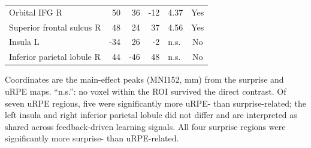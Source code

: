 \begin{table}[htbp]
\begin{threeparttable}
\begin{tabularx}{\textwidth}{l *{3}{R} l c}
        Orbital IFG R            & 50  & 36  & -12 & 4.37 & Yes \\
        Superior frontal sulcus R& 48  & 24  & 37  & 4.56 & Yes \\
        Insula L                 & -34 & 26  & -2  & n.s. & No  \\
        Inferior parietal lobule R& 44 & -46 & 48  & n.s. & No  \\
        \bottomrule
    \end{tabularx}
    \begin{tablenotes}\footnotesize
    \item Coordinates are the main-effect peaks (MNI152, mm) from the surprise and
    uRPE maps. ``n.s.'': no voxel within the ROI survived the direct contrast.
    Of seven uRPE regions, five were significantly more uRPE- than surprise-related;
    the left insula and right inferior parietal lobule did not differ and are
    interpreted as shared across feedback-driven learning signals. All four surprise
    regions were significantly more surprise- than uRPE-related.
    \end{tablenotes}
    \end{threeparttable}
\end{table}%
